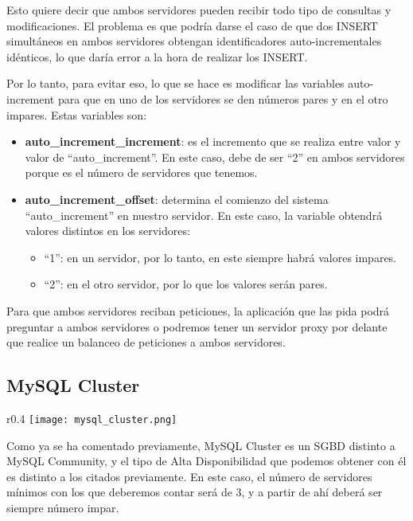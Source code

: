Esto quiere decir que ambos servidores pueden recibir todo tipo de consultas y modificaciones. El problema es que podría darse el caso de que dos INSERT simultáneos en ambos servidores obtengan identificadores auto-incrementales idénticos, lo que daría error a la hora de realizar los INSERT.

Por lo tanto, para evitar eso, lo que se hace es modificar las variables auto-increment para que en uno de los servidores se den números pares y en el otro impares.  Estas variables son:


\begin{itemize}
    \item \textbf{auto\_increment\_increment}: es el incremento que se realiza entre valor y valor de “auto\_increment”. En este caso, debe de ser “2” en ambos servidores porque es el número de servidores que tenemos.
    \item \textbf{auto\_increment\_offset}: determina el comienzo del sistema “auto\_increment” en nuestro servidor. En este caso, la variable obtendrá valores distintos en los servidores:
    \begin{itemize}
        \item “1”: en un servidor, por lo tanto, en este siempre habrá valores impares.
        \item “2”: en el otro servidor, por lo que los valores serán pares.
    \end{itemize}
\end{itemize}


Para que ambos servidores reciban peticiones, la aplicación que las pida podrá preguntar a ambos servidores o podremos tener un servidor proxy por delante que realice un balanceo de peticiones a ambos servidores.



\subsection{MySQL Cluster}
\begin{wrapfigure}{r}{0.4\linewidth}
    \centering
    \vspace{-50pt}
    \texttt{[image: mysql\_cluster.png]}
    \vspace{-50pt}
\end{wrapfigure}
Como ya se ha comentado previamente, MySQL Cluster es un SGBD distinto a MySQL Community, y el tipo de Alta Disponibilidad que podemos obtener con él es distinto a los citados previamente. En este caso, el número de servidores mínimos con los que deberemos contar será de 3, y a partir de ahí deberá ser siempre número impar.

